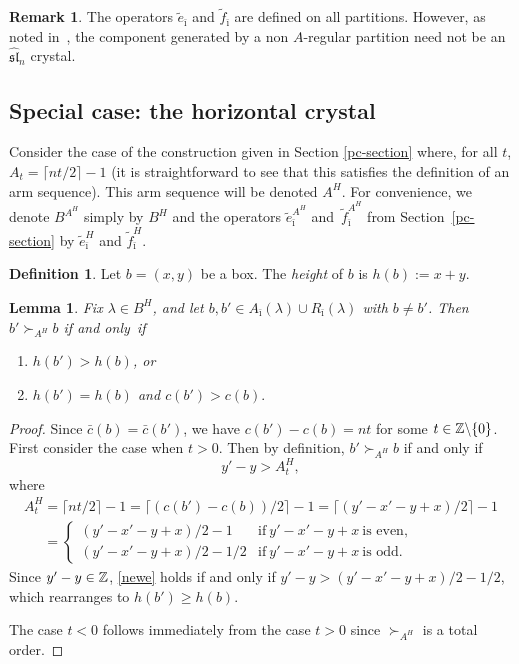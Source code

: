 \documentclass[11pt]{article}
\newtheorem{Lemma}[Theorem]{Lemma}
\theoremstyle{definition}
\newtheorem{Remark}[Theorem]{Remark}
\newtheorem{Definition}[Theorem]{Definition}
\newcommand{\bz}{\Bbb{Z}}
\newcommand{\asl}{\widehat{\mathfrak{{sl}}}}
\begin{document}
\begin{Remark} The operators $\tilde e_{\bar \imath}$ and $\tilde f_{\bar \imath}$ are def\/ined on all partitions. However, as noted in~\cite{Fayers:2009}, the component generated by a non $A$-regular partition need not be an $\asl_n$ crystal.
\end{Remark}

\subsection{Special case: the horizontal crystal} \label{flat-section}
Consider the case of the construction given in Section \ref{pc-section} where, for all $t$, $A_t=\lceil nt/2 \rceil-1$ (it is straightforward to see that this satisf\/ies the def\/inition of an arm sequence). This arm sequence will be denoted $A^H$. For convenience, we denote $B^{A^H}$ simply by $B^H$ and the operators $\tilde e_{\bar \imath}^{A^H}$ and~$\tilde f_{\bar \imath}^{A^H}$ from Section~\ref{pc-section} by $\tilde e_{\bar \imath}^{H}$ and $\tilde f_{\bar \imath}^{H}$.

\begin{Definition} Let $b=(x,y)$ be a box.
The \emph{height} of $b$ is $h(b):= x+y$.
\end{Definition}

\begin{Lemma} \label{flat-order} Fix $\lambda \in B^{H}$, and let $b, b' \in A_{\bar \imath}(\lambda) \cup R_{\bar \imath}(\lambda)$ with $b \neq b'$. Then $b' \succ_{A^H} b$ if and only~if
\begin{enumerate}\itemsep=0pt
\item $h(b') > h(b)$, or
\item  $h(b')= h(b)$ and $c(b') > c(b).$
\end{enumerate}
\end{Lemma}

\begin{proof} Since $\bar c(b) = \bar c(b')$, we have $c(b')-c(b)=nt$ for some $t \in \bz \backslash \{ 0 \}$. First consider the case when $t>0$. Then by def\/inition, $b' \succ_{A^H} b$ if and only if
\begin{equation} \label{newe}
y'-y> A^H_t,
\end{equation}
where
\begin{gather*}
A^H_t  =  \lceil nt/2 \rceil-1 =  \lceil (c(b')-c(b))/2 \rceil-1 = \lceil (y'-x'-y+x)/2 \rceil-1 \\
\phantom{A^H_t}{} = \begin{cases}
(y'-x'-y+x)/2 -1&  \text{if} \ y'-x'-y+x \ \text{is even}, \\
(y'-x'-y+x)/2 -1/2 &  \text{if} \ y'-x'-y+x \ \text{is odd}.
\end{cases}
\end{gather*}
Since $y'-y \in \bz$, \eqref{newe} holds if and only if
$y'-y > (y'-x'-y+x)/2 -1/2$, which rearranges to $h(b') \geq h(b)$.

The case $t<0$ follows immediately from the case $t>0$ since $\succ_{A^H}$ is a total order.
\end{proof}
\end{document}
